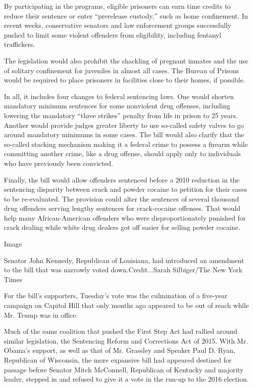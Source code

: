 By participating in the programs, eligible prisoners can earn time
credits to reduce their sentence or enter ``prerelease custody,'' such
as home confinement. In recent weeks, conservative senators and law
enforcement groups successfully pushed to limit some violent offenders
from eligibility, including fentanyl traffickers.

The legislation would also prohibit the shackling of pregnant inmates
and the use of solitary confinement for juveniles in almost all cases.
The Bureau of Prisons would be required to place prisoners in facilities
close to their homes, if possible.

In all, it includes four changes to federal sentencing laws. One would
shorten mandatory minimum sentences for some nonviolent drug offenses,
including lowering the mandatory ``three strikes'' penalty from life in
prison to 25 years. Another would provide judges greater liberty to use
so-called safety valves to go around mandatory minimums in some cases.
The bill would also clarify that the so-called stacking mechanism making
it a federal crime to possess a firearm while committing another crime,
like a drug offense, should apply only to individuals who have
previously been convicted.

Finally, the bill would allow offenders sentenced before a 2010
reduction in the sentencing disparity between crack and powder cocaine
to petition for their cases to be re-evaluated. The provision could
alter the sentences of several thousand drug offenders serving lengthy
sentences for crack-cocaine offenses. That would help many
African-American offenders who were disproportionately punished for
crack dealing while white drug dealers got off easier for selling powder
cocaine.

Image

Senator John Kennedy, Republican of Louisiana, had introduced an
amendment to the bill that was narrowly voted down.Credit...Sarah
Silbiger/The New York Times

For the bill's supporters, Tuesday's vote was the culmination of a
five-year campaign on Capitol Hill that only months ago appeared to be
out of reach while Mr. Trump was in office.

Much of the same coalition that pushed the First Step Act had rallied
around similar legislation, the Sentencing Reform and Corrections Act of
2015. With Mr. Obama's support, as well as that of Mr. Grassley and
Speaker Paul D. Ryan, Republican of Wisconsin, the more expansive bill
had appeared destined for passage before Senator Mitch McConnell,
Republican of Kentucky and majority leader, stepped in and refused to
give it a vote in the run-up to the 2016 election.


